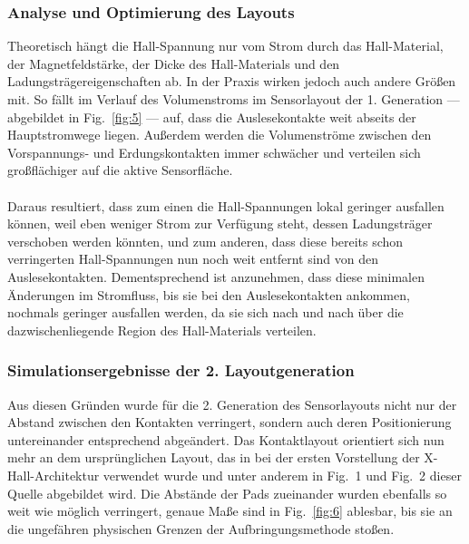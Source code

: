 \documentclass[12pt, a4paper]{article}
\begin{document}
\subsubsection{Analyse und Optimierung des Layouts}
Theoretisch hängt die Hall-Spannung nur vom Strom durch das Hall-Material, der Magnetfeldstärke, der Dicke des Hall-Materials und den Ladungsträgereigenschaften ab. In der Praxis wirken jedoch auch andere Größen mit. \newline
So fällt im Verlauf des Volumenstroms im Sensorlayout der 1. Generation --- abgebildet in Fig.~\ref{fig:5} --- auf, dass die Auslesekontakte weit abseits der Hauptstromwege liegen. Außerdem werden die Volumenströme zwischen den Vorspannungs- und Erdungskontakten immer schwächer und verteilen sich großflächiger auf die aktive Sensorfläche.

\paragraph{}
Daraus resultiert, dass zum einen die Hall-Spannungen lokal geringer ausfallen können, weil eben weniger Strom zur Verfügung steht, dessen Ladungsträger verschoben werden könnten, und zum anderen, dass diese bereits schon verringerten Hall-Spannungen nun noch weit entfernt sind von den Auslesekontakten. Dementsprechend ist anzunehmen, dass diese minimalen Änderungen im Stromfluss, bis sie bei den Auslesekontakten ankommen, nochmals geringer ausfallen werden, da sie sich nach und nach über die dazwischenliegende Region des Hall-Materials verteilen.

\subsubsection{Simulationsergebnisse der 2. Layoutgeneration}
Aus diesen Gründen wurde für die 2. Generation des Sensorlayouts nicht nur der Abstand zwischen den Kontakten verringert, sondern auch deren Positionierung untereinander entsprechend abgeändert.\newline
Das Kontaktlayout orientiert sich nun mehr an dem ursprünglichen Layout, das in \cite{cres18} bei der ersten Vorstellung der X-Hall-Architektur verwendet wurde und unter anderem in Fig.~1 und Fig.~2 dieser Quelle abgebildet wird.\newline
Die Abstände der Pads zueinander wurden ebenfalls so weit wie möglich verringert, genaue Maße sind in Fig.~\ref{fig:6} ablesbar, bis sie an die ungefähren physischen Grenzen der Aufbringungsmethode stoßen. 
\paragraph{}
\end{document}
